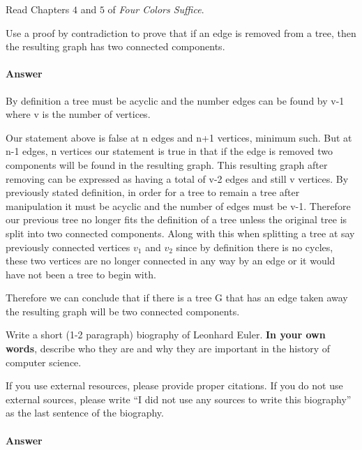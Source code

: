 \documentclass{article}
\begin{document}
Read Chapters $4$ and $5$ of \emph{Four Colors Suffice}.

Use a proof by contradiction to prove that if an edge is removed from a
tree, then the resulting graph has two connected components.

\paragraph{Answer}
By definition a tree must be acyclic and the number edges can be found by v-1
where v is the number of vertices.

Our statement above is false at n edges and n+1 vertices, minimum such. But at
n-1 edges, n vertices our statement is true in that if the edge is removed two components will
be found in the resulting graph. This resulting graph after removing can be
expressed as having a total of v-2 edges and still v vertices. By previously
stated definition, in order for a tree to remain a tree after manipulation it must
be acyclic and the number of edges must be v-1. Therefore our previous tree no
longer fits the definition of a tree unless the original tree is split into two
connected components. Along with this when splitting a tree at say previously
connected vertices $v_1$ and $v_2$ since by definition there is no cycles, these
two vertices are no longer connected in any way by an edge or it would have not
been a tree to begin with.

Therefore we can conclude that if there is a tree G that has an edge taken away
the resulting graph will be two connected components.



Write a short (1-2 paragraph) biography of Leonhard Euler.
\textbf{In your own words}, describe who they are and why they are important in
the history of computer science.

If you use external resources, please provide
proper citations. If you do not use external sources, please write ``I did not
use any sources to write this biography'' as the last sentence of the
biography.

\paragraph{Answer}
\end{document}
